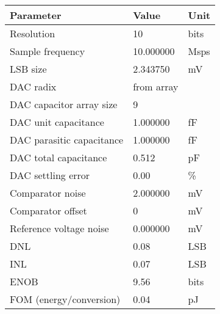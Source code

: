 \begin{tabular}{lll}
\toprule
Parameter & Value & Unit \\
\midrule
Resolution & 10 & bits \\
Sample frequency & 10.000000 & Msps \\
LSB size & 2.343750 & mV \\
DAC radix & from array &  \\
DAC capacitor array size & 9 &  \\
DAC unit capacitance & 1.000000 & fF \\
DAC parasitic capacitance & 1.000000 & fF \\
DAC total capacitance & 0.512 & pF \\
DAC settling error & 0.00 & \% \\
Comparator noise & 2.000000 & mV \\
Comparator offset & 0 & mV \\
Reference voltage noise & 0.000000 & mV \\
DNL & 0.08 & LSB \\
INL & 0.07 & LSB \\
ENOB & 9.56 & bits \\
FOM (energy/conversion) & 0.04 & pJ \\
\bottomrule
\end{tabular}
